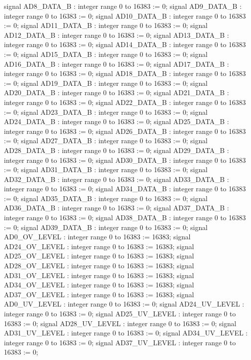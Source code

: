 \begin{mylisting}[language=VHDL,caption=AD変換モジュール,label=appF_ADC_module_VHDL]
	signal AD8_DATA_B		: integer range 0 to 16383			:= 0;
	signal AD9_DATA_B		: integer range 0 to 16383			:= 0;
	signal AD10_DATA_B		: integer range 0 to 16383			:= 0;
	signal AD11_DATA_B		: integer range 0 to 16383			:= 0;
	signal AD12_DATA_B		: integer range 0 to 16383			:= 0;
	signal AD13_DATA_B		: integer range 0 to 16383			:= 0;
	signal AD14_DATA_B		: integer range 0 to 16383			:= 0;
	signal AD15_DATA_B		: integer range 0 to 16383			:= 0;
	signal AD16_DATA_B		: integer range 0 to 16383			:= 0;
	signal AD17_DATA_B		: integer range 0 to 16383			:= 0;
	signal AD18_DATA_B		: integer range 0 to 16383			:= 0;
	signal AD19_DATA_B		: integer range 0 to 16383			:= 0;
	signal AD20_DATA_B		: integer range 0 to 16383			:= 0;
	signal AD21_DATA_B		: integer range 0 to 16383			:= 0;
	signal AD22_DATA_B		: integer range 0 to 16383			:= 0;
	signal AD23_DATA_B		: integer range 0 to 16383			:= 0;
	signal AD24_DATA_B		: integer range 0 to 16383			:= 0;
	signal AD25_DATA_B		: integer range 0 to 16383			:= 0;
	signal AD26_DATA_B		: integer range 0 to 16383			:= 0;
	signal AD27_DATA_B		: integer range 0 to 16383			:= 0;
	signal AD28_DATA_B		: integer range 0 to 16383			:= 0;
	signal AD29_DATA_B		: integer range 0 to 16383			:= 0;
	signal AD30_DATA_B		: integer range 0 to 16383			:= 0;
	signal AD31_DATA_B		: integer range 0 to 16383			:= 0;
	signal AD32_DATA_B		: integer range 0 to 16383			:= 0;
	signal AD33_DATA_B		: integer range 0 to 16383			:= 0;
	signal AD34_DATA_B		: integer range 0 to 16383			:= 0;
	signal AD35_DATA_B		: integer range 0 to 16383			:= 0;
	signal AD36_DATA_B		: integer range 0 to 16383			:= 0;
	signal AD37_DATA_B		: integer range 0 to 16383			:= 0;
	signal AD38_DATA_B		: integer range 0 to 16383			:= 0;
	signal AD39_DATA_B		: integer range 0 to 16383			:= 0;
	signal AD0_OV_LEVEL		: integer range 0 to 16383			:= 16383;
	signal AD24_OV_LEVEL	: integer range 0 to 16383			:= 16383;
	signal AD25_OV_LEVEL	: integer range 0 to 16383			:= 16383;
	signal AD28_OV_LEVEL	: integer range 0 to 16383			:= 16383;
	signal AD31_OV_LEVEL	: integer range 0 to 16383			:= 16383;
	signal AD34_OV_LEVEL	: integer range 0 to 16383			:= 16383;
	signal AD37_OV_LEVEL	: integer range 0 to 16383			:= 16383;
	signal AD0_UV_LEVEL		: integer range 0 to 16383			:= 0;
	signal AD24_UV_LEVEL	: integer range 0 to 16383			:= 0;
	signal AD25_UV_LEVEL	: integer range 0 to 16383			:= 0;
	signal AD28_UV_LEVEL	: integer range 0 to 16383			:= 0;
	signal AD31_UV_LEVEL	: integer range 0 to 16383			:= 0;
	signal AD34_UV_LEVEL	: integer range 0 to 16383			:= 0;
	signal AD37_UV_LEVEL	: integer range 0 to 16383			:= 0;


\end{mylisting}
